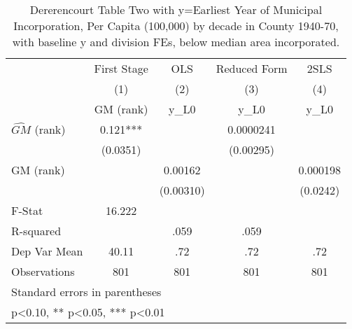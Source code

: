 \begin{table}[htbp]\centering
\def\sym#1{\ifmmode^{#1}\else\(^{#1}\)\fi}
\caption{Dererencourt Table Two with y=Earliest Year of Municipal Incorporation, Per Capita (100,000) by decade in County 1940-70, with baseline y and division FEs, below median area incorporated.}
\begin{tabular}{l*{4}{c}}
\toprule
                    & First Stage   &         OLS   &Reduced Form   &        2SLS   \\
                    &\multicolumn{1}{c}{(1)}&\multicolumn{1}{c}{(2)}&\multicolumn{1}{c}{(3)}&\multicolumn{1}{c}{(4)}\\
                    &\multicolumn{1}{c}{GM  (rank)}&\multicolumn{1}{c}{y\_L0}&\multicolumn{1}{c}{y\_L0}&\multicolumn{1}{c}{y\_L0}\\
\midrule
$\hat{GM}$ (rank)   &       0.121***&               &   0.0000241   &               \\
                    &    (0.0351)   &               &   (0.00295)   &               \\
\addlinespace
GM  (rank)          &               &     0.00162   &               &    0.000198   \\
                    &               &   (0.00310)   &               &    (0.0242)   \\
\midrule
F-Stat              &      16.222   &               &               &               \\
R-squared           &               &        .059   &        .059   &               \\
Dep Var Mean        &       40.11   &         .72   &         .72   &         .72   \\
Observations        &         801   &         801   &         801   &         801   \\
\bottomrule
\multicolumn{5}{l}{\footnotesize Standard errors in parentheses}\\
\multicolumn{5}{l}{\footnotesize * p<0.10, ** p<0.05, *** p<0.01}\\
\end{tabular}
\end{table}
